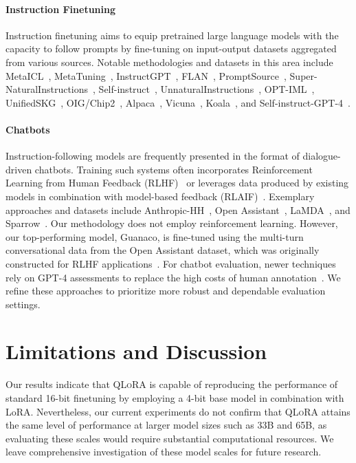 \paragraph{Instruction Finetuning} Instruction finetuning aims to equip pretrained large language models with the capacity to follow prompts by fine-tuning on input-output datasets aggregated from various sources. Notable methodologies and datasets in this area include MetaICL~\citep{min2021metaicl}, MetaTuning~\citep{zhong2021adapting}, InstructGPT~\citep{ouyang2022training}, FLAN~\citep{wei2021finetuned,chung2022scaling}, PromptSource~\citep{bach2022promptsource}, Super-NaturalInstructions~\citep{wang2022super,sanh2021multitask}, Self-instruct~\citep{wang2022self}, UnnaturalInstructions~\citep{honovich2022unnatural}, OPT-IML~\citep{iyer2022opt}, UnifiedSKG~\citep{xie2022unifiedskg}, OIG/Chip2~\citep{laion2023}, Alpaca~\citep{alpaca}, Vicuna~\citep{vicuna2023}, Koala~\citep{koala_blogpost_2023}, and Self-instruct-GPT-4~\citep{peng2023instruction}.

\paragraph{Chatbots} Instruction-following models are frequently presented in the format of dialogue-driven chatbots. Training such systems often incorporates Reinforcement Learning from Human Feedback (RLHF)~\citep{christiano2017deep} or leverages data produced by existing models in combination with model-based feedback (RLAIF)~\citep{bai2022constitutional}. Exemplary approaches and datasets include Anthropic-HH~\citep{askell2021general,bai2022training}, Open Assistant~\citep{kopf2023openassistant}, LaMDA~\citep{thoppilan2022lamda}, and Sparrow~\citep{glaese2022improving}. Our methodology does not employ reinforcement learning. However, our top-performing model, Guanaco, is fine-tuned using the multi-turn conversational data from the Open Assistant dataset, which was originally constructed for RLHF applications~\citep{kopf2023openassistant}. For chatbot evaluation, newer techniques rely on GPT-4 assessments to replace the high costs of human annotation~\citep{vicuna2023,peng2023instruction}. We refine these approaches to prioritize more robust and dependable evaluation settings.

\section{Limitations and Discussion}

Our results indicate that \textsc{QLoRA} is capable of reproducing the performance of standard 16-bit finetuning by employing a 4-bit base model in combination with LoRA. Nevertheless, our current experiments do not confirm that \textsc{QLoRA} attains the same level of performance at larger model sizes such as 33B and 65B, as evaluating these scales would require substantial computational resources. We leave comprehensive investigation of these model scales for future research.

